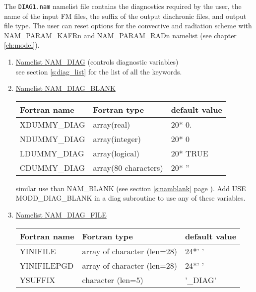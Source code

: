 The {\tt DIAG1.nam} namelist file contains the diagnostics required
by the user, the name of the input FM files, the suffix of the
output diachronic files, and output file type. The user can reset
options for the convective and radiation scheme with
NAM\_PARAM\_KAFRn and NAM\_PARAM\_RADn namelist  (see chapter
\ref{ch:model}).
\begin{enumerate}
\item\underline{Namelist NAM\_DIAG} (controls diagnostic variables)\\

see section \ref{s:diag_list} for the list of all the keywords.

\item\underline{Namelist NAM\_DIAG\_BLANK}
\begin{center}
\begin{tabular} {|l|l|l|}
\hline
Fortran name & Fortran type & default value \\
\hline
XDUMMY\_DIAG \index{XDUMMY\_DIAG!\innam{NAM\_DIAG\_BLANK}}  & array(real)          & 20* 0.   \\
NDUMMY\_DIAG \index{NDUMMY\_DIAG!\innam{NAM\_DIAG\_BLANK}}  & array(integer)       & 20* 0    \\
LDUMMY\_DIAG \index{LDUMMY\_DIAG!\innam{NAM\_DIAG\_BLANK}}  & array(logical)       & 20* TRUE \\
CDUMMY\_DIAG \index{CDUMMY\_DIAG!\innam{NAM\_DIAG\_BLANK}}  & array(80 characters) & 20* ''   \\
\hline
\end{tabular}
\end{center}
similar use than NAM\_BLANK (see section \ref{s:namblank} page \pageref{s:namblank}).
Add USE MODD\_DIAG\_BLANK in a diag subroutine to use
any of these variables.

\item\underline{Namelist NAM\_DIAG\_FILE} 
\begin{center}
\begin{tabular} {|l|l|l|}
\hline
Fortran name & Fortran type & default value\\
\hline
\hline
YINIFILE     & array of character (len=28)  & 24*' '   \\
YINIFILEPGD  & array of character (len=28)  & 24*' '   \\
YSUFFIX      & character (len=5)  & '\_DIAG'   \\
\hline
\end{tabular}
\end{center}


\end{enumerate}
